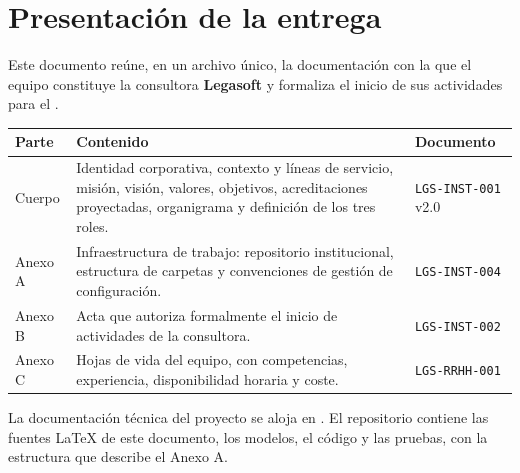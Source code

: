 \documentclass[11pt,a4paper]{article}
\begin{document}
\lgportada

\section*{Presentación de la entrega}

Este documento reúne, en un archivo único, la documentación con la que el equipo
constituye la consultora \textbf{Legasoft} y formaliza el inicio de sus
actividades para el \lgSemestre.

\begin{center}
\begin{tabularx}{\linewidth}{@{}L{2.4cm} Y L{3.6cm}@{}}
\toprule
\sffamily\bfseries\color{lgPrimario}Parte &
\sffamily\bfseries\color{lgPrimario}Contenido &
\sffamily\bfseries\color{lgPrimario}Documento \\
\midrule
Cuerpo   & Identidad corporativa, contexto y líneas de servicio, misión, visión, valores, objetivos, acreditaciones proyectadas, organigrama y definición de los tres roles. & \texttt{LGS-INST-001} v2.0 \\
Anexo A  & Infraestructura de trabajo: repositorio institucional, estructura de carpetas y convenciones de gestión de configuración. & \texttt{LGS-INST-004} \\
Anexo B  & Acta que autoriza formalmente el inicio de actividades de la consultora. & \texttt{LGS-INST-002} \\
Anexo C  & Hojas de vida del equipo, con competencias, experiencia, disponibilidad horaria y coste. & \texttt{LGS-RRHH-001} \\
\bottomrule
\end{tabularx}
\end{center}

\begin{nota}
La documentación técnica del proyecto se aloja en
\href{\lgRepo}{\lgRepoCorto}. El repositorio contiene las fuentes \LaTeX{} de
este documento, los modelos, el código y las pruebas, con la estructura que
describe el Anexo A.
\end{nota}


\clearpage
\tableofcontents
\clearpage



\clearpage


\clearpage


\clearpage

\end{document}
